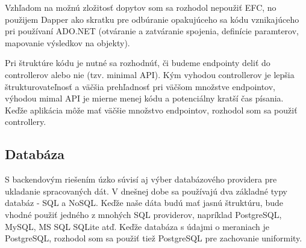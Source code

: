 Vzhľadom na možnú zložitosť dopytov som sa rozhodol nepoužiť EFC, no použijem Dapper ako skratku pre odbúranie opakujúceho sa kódu vznikajúceho 
pri používaní ADO.NET (otváranie a zatváranie spojenia, definície paramterov, mapovanie výsledkov na objekty).

Pri štruktúre kódu je nutné sa rozhodnúť, či budeme endpointy deliť do controllerov alebo nie (tzv. minimal API). Kým vyhodou controllerov je lepšia 
štrukturovateľnosť a väčšia prehľadnosť pri väčšom množstve endpointov, výhodou mimal API je mierne menej kódu a potenciálny kratší čas písania. Keďže 
aplikácia môže mať väčšie množstvo endpointov, rozhodol som sa použiť controllery.

\subsection{Databáza}

S backendovým riešením úzko súvisí aj výber databázového providera pre ukladanie spracovaných dát. V dnešnej dobe sa používajú dva základné typy databáz 
- SQL a NoSQL. Keďže naše dáta budú mať jasnú štruktúru, bude vhodné použiť jedného z mnohých SQL providerov, napríklad PostgreSQL, MySQL, MS SQL SQLite atď. 
Keďže databáza s údajmi o meraniach je PostgreSQL, rozhodol som sa použiť tiež PostgreSQL pre zachovanie uniformity.